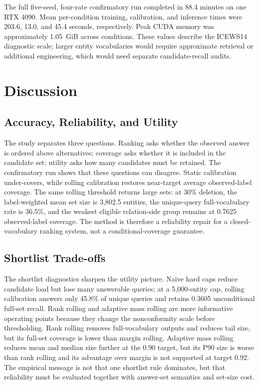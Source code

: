 \documentclass[10pt,twocolumn]{article}
\begin{document}
The full five-seed, four-rate confirmatory run completed in 88.4 minutes on one
RTX 4090. Mean per-condition training, calibration, and inference times were
203.6, 13.0, and 45.4 seconds, respectively. Peak CUDA memory was approximately
1.05~GiB across conditions. These values describe the ICEWS14 diagnostic scale;
larger entity vocabularies would require approximate retrieval or additional
engineering, which would need separate candidate-recall audits.

\FloatBarrier

\section{Discussion}
\label{sec:discussion}

\subsection{Accuracy, Reliability, and Utility}

The study separates three questions. Ranking asks whether the observed answer
is ordered above alternatives; coverage asks whether it is included in the
candidate set; utility asks how many candidates must be retained. The
confirmatory run shows that these questions can disagree. Static calibration
under-covers, while rolling calibration restores near-target average
observed-label coverage. The same rolling threshold returns large sets: at
30\% deletion, the label-weighted mean set size is 3,802.5 entities, the
unique-query full-vocabulary rate is 36.5\%, and the weakest eligible
relation-side group remains at 0.7625 observed-label coverage. The method is
therefore a reliability repair for a closed-vocabulary ranking system, not a
conditional-coverage guarantee.

\subsection{Shortlist Trade-offs}

The shortlist diagnostics sharpen the utility picture. Naive hard caps reduce
candidate load but lose many answerable queries; at a 5,000-entity cap, rolling
calibration answers only 45.8\% of unique queries and retains 0.3605
unconditional full-set recall. Rank rolling and adaptive mass rolling are more
informative operating points because they change the nonconformity scale before
thresholding. Rank rolling removes full-vocabulary outputs and reduces tail
size, but its full-set coverage is lower than margin rolling. Adaptive mass
rolling reduces mean and median size further at the 0.90 target, but its P90
size is worse than rank rolling and its advantage over margin is not supported
at target 0.92. The empirical message is not that one shortlist rule dominates,
but that reliability must be evaluated together with answer-set semantics and
set-size cost.
\end{document}
